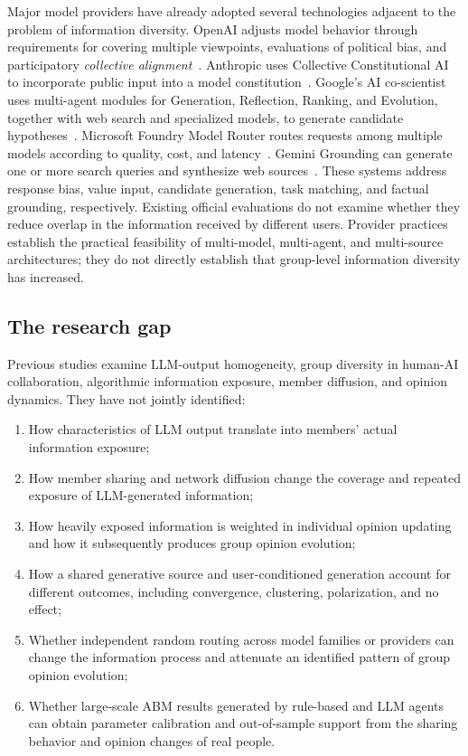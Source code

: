 \documentclass[11pt,a4paper]{article}
\newcommand{\term}[1]{\textit{#1}}
\begin{document}
Major model providers have already adopted several technologies adjacent to the problem of information diversity. OpenAI adjusts model behavior through requirements for covering multiple viewpoints, evaluations of political bias, and participatory \term{collective alignment}~\citep{openai_political_bias,openai_collective_alignment}. Anthropic uses Collective Constitutional AI to incorporate public input into a model constitution~\citep{anthropic2023}. Google's AI co-scientist uses multi-agent modules for Generation, Reflection, Ranking, and Evolution, together with web search and specialized models, to generate candidate hypotheses~\citep{gottweis2025}. Microsoft Foundry Model Router routes requests among multiple models according to quality, cost, and latency~\citep{microsoft2026}. Gemini Grounding can generate one or more search queries and synthesize web sources~\citep{google2026}. These systems address response bias, value input, candidate generation, task matching, and factual grounding, respectively. Existing official evaluations do not examine whether they reduce overlap in the information received by different users. Provider practices establish the practical feasibility of multi-model, multi-agent, and multi-source architectures; they do not directly establish that group-level information diversity has increased.

\subsection{The research gap}

Previous studies examine LLM-output homogeneity, group diversity in human-AI collaboration, algorithmic information exposure, member diffusion, and opinion dynamics. They have not jointly identified:

\begin{enumerate}
\item How characteristics of LLM output translate into members' actual information exposure;
\item How member sharing and network diffusion change the coverage and repeated exposure of LLM-generated information;
\item How heavily exposed information is weighted in individual opinion updating and how it subsequently produces group opinion evolution;
\item How a shared generative source and user-conditioned generation account for different outcomes, including convergence, clustering, polarization, and no effect;
\item Whether independent random routing across model families or providers can change the information process and attenuate an identified pattern of group opinion evolution;
\item Whether large-scale ABM results generated by rule-based and LLM agents can obtain parameter calibration and out-of-sample support from the sharing behavior and opinion changes of real people.
\end{enumerate}
\end{document}
